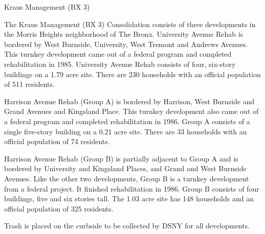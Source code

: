 Kraus Management (BX 3)

The Kraus Management (BX 3) Consolidation consists of three developments in the Morris Heights neighborhood of The Bronx. University Avenue Rehab is bordered by West Burnside, University, West Tremont and Andrews Avenues. This turnkey development came out of a federal program and completed rehabilitation in 1985. University Avenue Rehab consists of four, six-story buildings on a 1.79 acre site. There are 230 households with an official population of 511 residents. 

Harrison Avenue Rehab (Group A) is bordered by Harrison, West Burnside and Grand Avenues and Kingsland Place. This turnkey development also came out of a federal program and completed rehabilitation in 1986. Group A consists of a single five-story building on a 0.21 acre site. There are 33 households with an official population of 74 residents.

Harrison Avenue Rehab (Group B) is partially adjacent to Group A and is bordered by University and Kingsland Places, and Grand and West Burnside Avenues. Like the other two developments, Group B is a turnkey development from a federal project. It finished rehabilitation in 1986. Group B consists of four buildings, five and six stories tall. The 1.03  acre site has 148 households and an official population of 325 residents.

Trash is placed on the curbside to be collected by DSNY for all developments.
